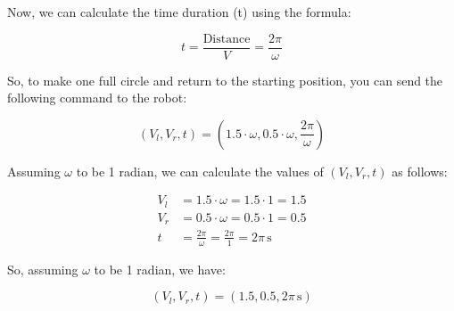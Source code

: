 \documentclass[answers]{exam}
\begin{document}
\begin{questions}
\begin{parts}
\begin{solution}
            Now, we can calculate the time duration (t) using the formula:

            \[t = \frac{\text{Distance}}{V} = \frac{2\pi}{\omega}\]

            So, to make one full circle and return to the starting position, you can send
            the following command to the robot:

            \[(V_l, V_r, t) = (1.5\cdot\omega, 0.5\cdot\omega, \frac{2\pi}{\omega})\]

            Assuming \(\omega\) to be 1 radian, we can calculate the values of \((V_l, V_r,
            t)\) as follows:

            \begin{align*}
                V_l & = 1.5 \cdot \omega = 1.5 \cdot 1  = 1.5                    \\
                V_r & = 0.5 \cdot \omega = 0.5 \cdot 1  = 0.5                    \\
                t   & = \frac{2\pi}{\omega} = \frac{2\pi}{1 } = 2\pi \, \text{s}
            \end{align*}

            So, assuming \(\omega\) to be 1 radian, we have:

            \[
                (V_l, V_r, t) = (1.5 , 0.5 , 2\pi \, \text{s})
            \]
        \end{solution}

\end{parts}
\end{questions}
\end{document}
